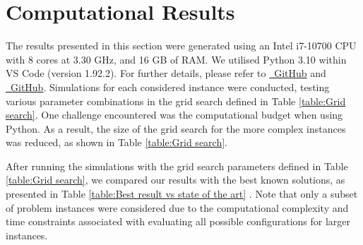 \section{Computational Results}


The results presented in this section were generated using an Intel i7-10700 CPU with 8 cores at 3.30 GHz, and 16 GB of RAM. We utilised Python 3.10 within VS Code (version 1.92.2). For further details, please refer to \href{https://github.com/adasilva33/DASA_Kiwi_TSP_Challenge_2}{\faGithub\ GitHub} and \href{https://github.com/ahmedkheiri//DASA_Kiwi_TSP_Challenge_2}{\faGithub\ GitHub}. 
Simulations for each considered instance were conducted, testing various parameter combinations in the grid search defined in Table \ref{table:Grid search}. One challenge encountered was the computational budget when using Python. As a result, the size of the grid search for the more complex instances was reduced, as shown in Table \ref{table:Grid search}.

\begin{table}[h]
    \centering
    \caption{Grid search}
    \label{table:Grid search}
\end{table}

After running the simulations with the grid search parameters defined in Table \ref{table:Grid search}, we compared our results with the best known solutions, as presented in Table \ref{table:Best result vs state of the art} \cite{reinforcement_learning_yaro}. Note that only a subset of problem instances were considered due to the computational complexity and time constraints associated with evaluating all possible configurations for larger instances. 


